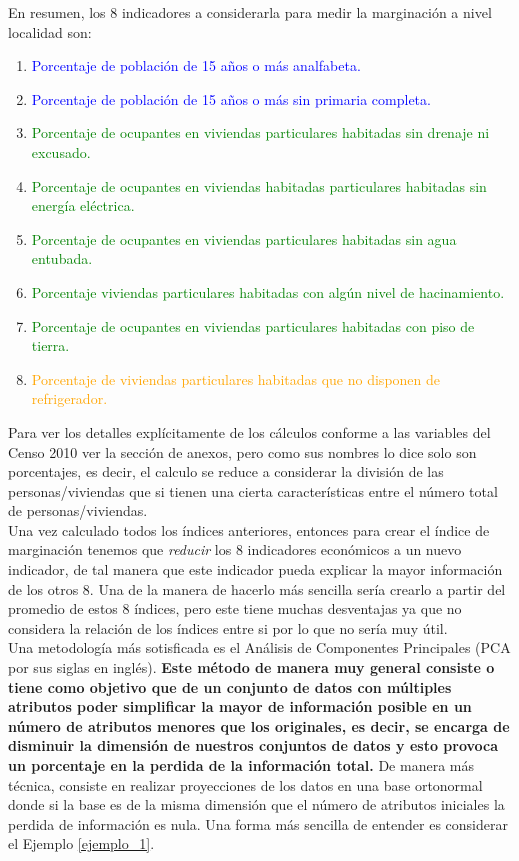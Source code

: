 \documentclass[paper=letter, fontsize=11pt]{scrartcl}
\numberwithin{equation}{section} %
\numberwithin{figure}{section} %
\numberwithin{table}{section} %
\begin{document}
En resumen, los 8 indicadores a considerarla para medir la marginación a nivel localidad son:
\begin{enumerate}
    \item \textcolor{blue}{Porcentaje de población de 15 años o más analfabeta.}
    \item \textcolor{blue}{Porcentaje de población de 15 años o más sin primaria completa.}
    \item \textcolor{green}{Porcentaje de ocupantes en viviendas particulares habitadas sin drenaje ni excusado.}
    \item \textcolor{green}{Porcentaje de ocupantes en viviendas habitadas particulares habitadas sin energía eléctrica.}
    \item \textcolor{green}{Porcentaje de ocupantes en viviendas particulares habitadas sin agua entubada.}
    \item \textcolor{green}{Porcentaje viviendas particulares habitadas con algún nivel de hacinamiento.}
    \item \textcolor{green}{Porcentaje de ocupantes en viviendas particulares habitadas con piso de tierra.}
    \item \textcolor{orange}{Porcentaje de viviendas particulares habitadas que no disponen de refrigerador.}
\end{enumerate}
Para ver los detalles explícitamente de los cálculos conforme a las variables del Censo 2010 ver la sección de anexos, pero como sus nombres lo dice solo son porcentajes, es decir, el calculo se reduce a considerar la división de las personas/viviendas que si tienen una cierta características entre el número total de personas/viviendas.\\ 

Una vez calculado todos los índices anteriores, entonces para crear el índice de marginación tenemos que \textit{reducir} los 8 indicadores económicos a un nuevo indicador, de tal manera que este indicador pueda explicar la mayor información de los otros 8. Una de la manera de hacerlo más sencilla sería crearlo a partir del promedio de estos 8 índices, pero este tiene muchas desventajas ya que no considera la relación de los índices entre si por lo que no sería muy útil. \\

Una metodología más sotisficada es el Análisis de Componentes Principales (PCA por sus siglas en inglés). \textbf{Este método de manera muy general consiste o tiene como objetivo que de un conjunto de datos con múltiples atributos poder simplificar la mayor de información posible en un número de atributos menores que los originales, es decir, se encarga de disminuir la dimensión de nuestros conjuntos de datos y esto provoca un porcentaje en la perdida de la información total.} De manera más técnica, consiste en realizar proyecciones de los datos en una base ortonormal donde si la base es de la misma dimensión que el número de atributos iniciales la perdida de información es nula. Una forma más sencilla de entender es considerar el Ejemplo \ref{ejemplo_1}.  
\end{document}

